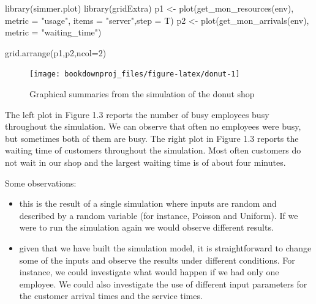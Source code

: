 \documentclass[
]{book}
\newenvironment{Shaded}{\begin{snugshade}}{\end{snugshade}}
\newcommand{\AttributeTok}[1]{\textcolor[rgb]{0.77,0.63,0.00}{#1}}
\newcommand{\DecValTok}[1]{\textcolor[rgb]{0.00,0.00,0.81}{#1}}
\newcommand{\FunctionTok}[1]{\textcolor[rgb]{0.00,0.00,0.00}{#1}}
\newcommand{\NormalTok}[1]{#1}
\newcommand{\OtherTok}[1]{\textcolor[rgb]{0.56,0.35,0.01}{#1}}
\newcommand{\StringTok}[1]{\textcolor[rgb]{0.31,0.60,0.02}{#1}}
\theoremstyle{definition}
\theoremstyle{definition}
\theoremstyle{definition}
\theoremstyle{definition}
\theoremstyle{remark}
\begin{document}
\begin{Shaded}
\begin{Highlighting}[]
\FunctionTok{library}\NormalTok{(simmer.plot)}
\FunctionTok{library}\NormalTok{(gridExtra)}
\NormalTok{p1 }\OtherTok{\textless{}{-}} \FunctionTok{plot}\NormalTok{(}\FunctionTok{get\_mon\_resources}\NormalTok{(env), }\AttributeTok{metric =} \StringTok{"usage"}\NormalTok{, }\AttributeTok{items =} \StringTok{"server"}\NormalTok{,}\AttributeTok{step =}\NormalTok{ T)}
\NormalTok{p2 }\OtherTok{\textless{}{-}} \FunctionTok{plot}\NormalTok{(}\FunctionTok{get\_mon\_arrivals}\NormalTok{(env), }\AttributeTok{metric =} \StringTok{"waiting\_time"}\NormalTok{)}

\FunctionTok{grid.arrange}\NormalTok{(p1,p2,}\AttributeTok{ncol=}\DecValTok{2}\NormalTok{)}
\end{Highlighting}
\end{Shaded}

\begin{figure}

{\centering \texttt{[image: bookdownproj\_files/figure-latex/donut-1]} 

}

\caption{Graphical summaries from the simulation of the donut shop}\label{fig:donut}
\end{figure}

The left plot in Figure 1.3 reports the number of busy employees busy throughout the simulation. We can observe that often no employees were busy, but sometimes both of them are busy. The right plot in Figure 1.3 reports the waiting time of customers throughout the simulation. Most often customers do not wait in our shop and the largest waiting time is of about four minutes.

Some observations:

\begin{itemize}
\item
  this is the result of a single simulation where inputs are random and described by a random variable (for instance, Poisson and Uniform). If we were to run the simulation again we would observe different results.
\item
  given that we have built the simulation model, it is straightforward to change some of the inputs and observe the results under different conditions. For instance, we could investigate what would happen if we had only one employee. We could also investigate the use of different input parameters for the customer arrival times and the service times.
\end{itemize}
\end{document}
